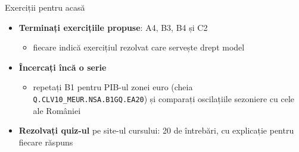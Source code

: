 \begin{frame}{Exerciții pentru acasă}
\itemsize{\small}
\begin{itemize}
    \item \textbf{Terminați exercițiile propuse}: A4, B3, B4 și C2
    \begin{itemize}
        \item fiecare indică exercițiul rezolvat care servește drept model
    \end{itemize}
    \item \textbf{Încercați încă o serie}
    \begin{itemize}
        \item repetați B1 pentru PIB-ul zonei euro (cheia \texttt{Q.CLV10\_MEUR.NSA.B1GQ.EA20}) și comparați oscilațiile sezoniere cu cele ale României
    \end{itemize}
    \item \textbf{Rezolvați quiz-ul } pe site-ul cursului: 20 de întrebări, cu explicație pentru fiecare răspuns
\end{itemize}
\end{frame}

